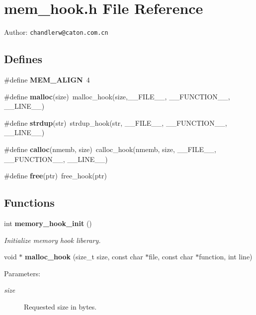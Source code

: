 \section{mem\_\-hook.h File Reference}
\label{mem__hook_8h}
\begin{Desc}
\item[Author:]{\tt chandlerw@caton.com.cn} \end{Desc}


\subsection*{Defines}
\begin{CompactItemize}
\item 
\#define \textbf{MEM\_\-ALIGN}~4\label{mem__hook_8h_1b2a8c80ee4dc0996e86c7ec56d46f53}

\item 
\#define \textbf{malloc}(size)~malloc\_\-hook(size,\_\-\_\-FILE\_\-\_\-, \_\-\_\-FUNCTION\_\-\_\-, \_\-\_\-LINE\_\-\_\-)\label{mem__hook_8h_2eb0b03d1a9de9615a291b1205969069}

\item 
\#define \textbf{strdup}(str)~strdup\_\-hook(str, \_\-\_\-FILE\_\-\_\-, \_\-\_\-FUNCTION\_\-\_\-, \_\-\_\-LINE\_\-\_\-)\label{mem__hook_8h_240017da032a09ed9c32a2895b959609}

\item 
\#define \textbf{calloc}(nmemb, size)~calloc\_\-hook(nmemb, size, \_\-\_\-FILE\_\-\_\-, \_\-\_\-FUNCTION\_\-\_\-, \_\-\_\-LINE\_\-\_\-)\label{mem__hook_8h_e32f02efe1c5b542d360e784bf67a2fc}

\item 
\#define \textbf{free}(ptr)~free\_\-hook(ptr)\label{mem__hook_8h_9cc854374299a1dd933bf62029761768}

\end{CompactItemize}
\subsection*{Functions}
\begin{CompactItemize}
\item 
int {\bf memory\_\-hook\_\-init} ()
\begin{CompactList}\small\item\em Initialize memory hook liberary. \item\end{CompactList}\item 
void $\ast$ {\bf malloc\_\-hook} (size\_\-t size, const char $\ast$file, const char $\ast$function, int line)
\begin{CompactList}\small\item\em \begin{Desc}
\item[Parameters:]
\begin{description}
\item[{\em size}]Requested size in bytes. \end{description}
\end{Desc}
\item\end{CompactList}\end{CompactItemize}


